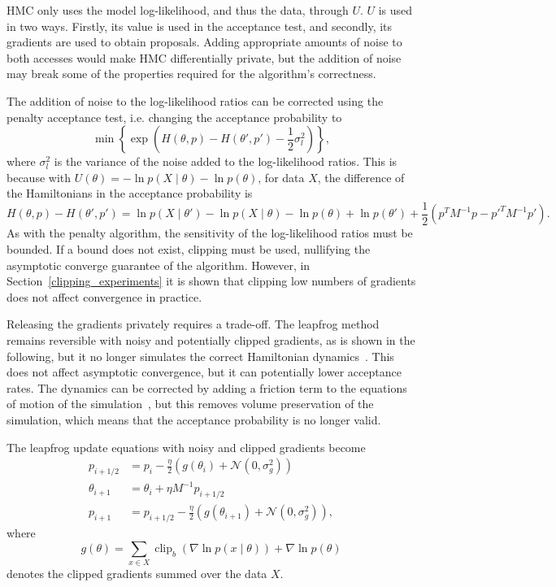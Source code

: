 \documentclass[english,twoside,openright]{HYgraduMLDS}
\newcommand{\caln}{{\mathcal{N}}}
\DeclareMathOperator{\clip}{clip}
\begin{document}
HMC only uses the model log-likelihood, and thus the data, through \(U\).
\(U\) is used in two ways. Firstly, its value is used in the acceptance test,
and secondly, its gradients are used to obtain proposals. Adding appropriate
amounts of noise to both accesses would make HMC differentially private, but the addition of
noise may break some of the properties required for the algorithm's correctness.

The addition of noise to the log-likelihood ratios can be corrected using the penalty
acceptance test, i.e. changing the acceptance probability to
\[
    \min\left\{\exp\left(H(\theta, p) - H(\theta', p') - \frac{1}{2}\sigma_{l}^{2}\right)\right\},
\]
where \(\sigma_{l}^{2}\) is the variance of the noise added to the log-likelihood
ratios. This is because with
\(U(\theta) = -\ln p(X\mid \theta) - \ln p(\theta)\),  for data \(X\),
the difference of the Hamiltonians in the acceptance probability is
\[
  H(\theta, p) - H(\theta', p') = \ln p(X\mid \theta') - \ln p(X\mid \theta)
  - \ln p(\theta) + \ln p(\theta')
  + \frac{1}{2}(p^{T}M^{-1}p - p'^{T}M^{-1}p').
\]
As with the penalty algorithm, the sensitivity of the log-likelihood ratios must
be bounded. If a bound does not exist, clipping must be used, nullifying the asymptotic
converge guarantee of the algorithm. However, in Section~\ref{clipping_experiments}
it is shown that
clipping low numbers of gradients does not affect convergence in practice.

Releasing the gradients privately requires a trade-off. The leapfrog method remains
reversible with noisy and potentially clipped gradients, as is shown in the following,
but it no longer simulates the correct Hamiltonian dynamics~\cite{CFG14}. This does not affect
asymptotic convergence, but it can potentially lower acceptance rates.
The dynamics can be corrected by adding a friction term to the equations of
motion of the simulation~\cite{CFG14}, but this removes volume preservation of the simulation,
which means that the acceptance probability is no longer valid.

The leapfrog update equations with noisy and clipped gradients become
\begin{align*}
  p_{i+1/2} &= p_{i} - \frac{\eta}{2}(g(\theta_{i}) + \caln(0, \sigma_{g}^{2})) \\
  \theta_{i+1} &= \theta_{i} + \eta M^{-1}p_{i+1/2} \\
  p_{i+1} &= p_{i+1/2} - \frac{\eta}{2}(g(\theta_{i+1}) + \caln(0, \sigma_{g}^{2})),
\end{align*}
where
\[
  g(\theta) = \sum_{x\in X}\clip_{b}(\nabla \ln p(x\mid \theta)) + \nabla\ln p(\theta)
\]
denotes the clipped gradients summed over the data \(X\).
\end{document}
